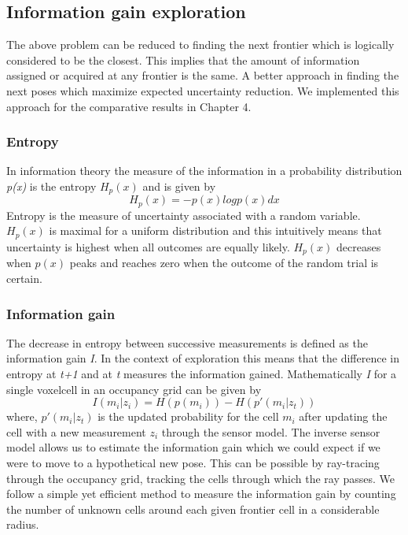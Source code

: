 \subsection{Information gain exploration}
The above problem can be reduced to finding the next frontier which is logically considered to be the closest. This implies that the amount of information assigned or acquired at any frontier is the same. A better approach in finding the next poses which maximize expected uncertainty reduction. We implemented this approach for the comparative results in Chapter 4. 

\subsubsection{Entropy}
In information theory the measure of the information in a probability distribution \textit{p(x)} is the entropy \textit{$H_p(x)$} and is given by
\begin{equation}
    H_p(x) = - p(x)logp(x)dx
\end{equation}
Entropy is the measure of uncertainty associated with a random variable. $H_p(x)$ is maximal for a uniform distribution and this intuitively means that uncertainty is highest when all outcomes are equally likely. $H_p(x)$ decreases when $p(x)$ peaks and reaches zero when the outcome of the random trial is certain.

\subsubsection{Information gain}
The decrease in entropy between successive measurements is defined as the information gain \textit{I}. In the context of exploration this means that the difference in entropy at \textit{t+1} and at \textit{t} measures the information gained. Mathematically \textit{I} for a single voxel\/cell in an occupancy grid can be given by
\begin{equation}
    I(m_i|z_i) = H(p(m_i)) - H(p'(m_i|z_t))
\end{equation}
where, $p'(m_i|z_t)$ is the updated probability for the cell $m_i$ after updating the cell with a new measurement $z_i$ through the sensor model. The inverse sensor model allows us to estimate the information gain which we could expect if we were to move to a hypothetical new pose. This can be possible by ray-tracing through the occupancy grid, tracking the cells through which the ray passes. We follow a simple yet efficient method to measure the information gain by counting the number of unknown cells around each given frontier cell in a considerable radius.

